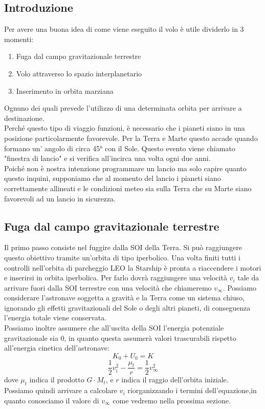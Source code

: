 \subsection{Introduzione}
Per avere una buona idea di come viene eseguito il volo è utile dividerlo in 3 momenti:
\begin{enumerate}
    \item Fuga dal campo gravitazionale terrestre
    \item Volo attraverso lo spazio interplanetario
    \item Inserimento in orbita marziana
\end{enumerate}
Ognuno dei quali prevede l'utilizzo di una determinata orbita per arrivare a destinazione.\\
Perché questo tipo di viaggio funzioni, è necessario che i pianeti siano in una posizione particolarmente favorevole. Per la Terra e Marte questo accade quando formano un' angolo di circa 45° con il Sole. Questo evento viene chiamato "finestra di lancio" e si verifica all'incirca una volta ogni due anni.\\
Poiché non è nostra intenzione programmare un lancio ma solo capire quanto questo inquini, supponiamo che al momento del lancio i pianeti siano correttamente allineati e le condizioni meteo sia sulla Terra che su Marte siano favorevoli ad un lancio in sicurezza.
\subsection{Fuga dal campo gravitazionale terrestre}
Il primo passo consiste nel fuggire dalla SOI della Terra. Si può raggiungere questo obiettivo tramite un'orbita di tipo iperbolico.
Una volta finiti tutti i controlli nell'orbita di parcheggio LEO la Starship è pronta a riaccendere i motori e inserirsi in orbita iperbolica.
Per farlo dovrà raggiungere una velocità $v_i$ tale da arrivare fuori dalla SOI terrestre con una velocità che chiameremo $v_\infty$. Possiamo considerare l'astronave soggetta a gravità e la Terra come un sistema chiuso, ignorando gli effetti gravitazionali del Sole o degli altri pianeti, di conseguenza l'energia totale viene conservata.\\
Possiamo inoltre assumere che all'uscita della SOI l'energia potenziale gravitazionale sia 0, in quanto questa assumerà valori trascurabili rispetto all'energia cinetica dell'astronave:
$$K_0 + U_0 = K$$
\begin{equation}
    \label{Velocità Terra}
    \frac{1}{2}v_i^2 - \frac{\mu_t}{r} = \frac{1}{2}v_{\infty}^2
\end{equation}
dove $\mu_t$ indica il prodotto $G \cdot M_t$, e $r$ indica il raggio dell'orbita iniziale.\\
Possiamo quindi arrivare a calcolare $v_i$ riorganizzando i termini dell'equazione,in quanto conosciamo il valore di $v_\infty$ come vedremo nella prossima sezione.

